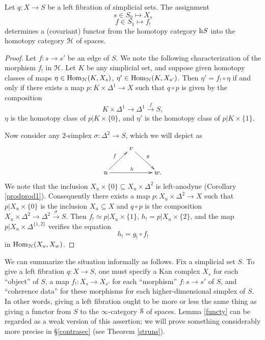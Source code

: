 \begin{lemma}\label{functy}
Let $q: X \rightarrow S$ be a left fibration of simplicial sets. The assignment
$$s \in S_0 \mapsto X_{s} $$
$$ f \in S_1 \mapsto f_{!} $$
determines a (covariant) functor from the homotopy category $\rm{h} \it{S}$ into the homotopy category $\operatorname{\mathcal{H}}$ of spaces.
\end{lemma}

\begin{proof}
Let $f: s \rightarrow s'$ be an edge of $S$.
We note the following characterization of the morphism $f_{!}$ in $\operatorname{\mathcal{H}}$. Let $K$ be any simplicial set, and suppose given homotopy classes of maps $\eta \in \operatorname{Hom}_{\operatorname{\mathcal{H}}}(K,X_{s})$, $\eta' \in \operatorname{Hom}_{\operatorname{\mathcal{H}}}(K,X_{s'})$. Then
$\eta' = f_{!} \circ \eta$ if and only if there exists a map $p: K \times \Delta^1 \rightarrow X$ such that
$q \circ p$ is given by the composition $$K \times \Delta^1 \rightarrow \Delta^1 \stackrel{f}{\rightarrow} S,$$
$\eta$ is the homotopy class of $p | K \times \{0\}$, and $\eta'$ is the homotopy class of $p| K \times \{1\}$. 

Now consider any $2$-simplex $\sigma: \Delta^2 \rightarrow S$, which we will depict as
$$ \xymatrix{ & v \ar[dr]^{g} & \\
u \ar[ur]^{f} \ar[rr]^{h} & & w. }$$
We note that the inclusion
$X_{ u } \times \{0\} \subseteq X_{ u } \times \Delta^2$ is left-anodyne 
(Corollary \ref{prodprod1}). Consequently there exists a map $p: X_{ u } \times \Delta^2 \rightarrow X$ such that $p| X_{u} \times \{0\}$ is the inclusion $X_{ u } \subseteq X$ and $q \circ p$ is the composition
$ X_{ u } \times \Delta^2 \rightarrow \Delta^2 \stackrel{\sigma}{\rightarrow} S$. 
Then $f_{!} \simeq p| X_{ u } \times \{1\}$, $h_{!} = p| X_{u} \times \{2 \}$, and the map $p | X_{ u } \times \Delta^{ \{1,2\} }$ verifies the equation
$$ h_{!} = g_{!} \circ f_{!}$$ in $\operatorname{Hom}_{\operatorname{\mathcal{H}}}( X_{u}, X_{ w })$.
\end{proof}

We can summarize the situation informally as follows. Fix a simplicial set $S$. To give a left fibration $q: X \rightarrow S$, one must specify a Kan complex $X_{s}$ for each ``object'' of $S$, a map
$f_{!}: X_{s} \rightarrow X_{s'}$ for each ``morphism'' $f: s \rightarrow s'$ of $S$, and ``coherence data'' for these morphisms for each higher-dimensional simplex of $S$. In other words, giving a left fibration ought to be more or less the same thing as giving a functor from $S$ to the $\infty$-category $\operatorname{\mathcal{S}}$ of spaces.
Lemma \ref{functy} can be regarded as a weak version of this assertion; we will prove something considerably more precise in \S \ref{contrasec} (see Theorem \ref{struns}). 

